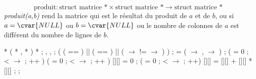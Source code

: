 \begin{solution}
  $$
  \mbox{produit}:  \mbox{struct matrice *} \times \mbox{struct matrice *}  \to \mbox{struct matrice *}
  $$
  \emph{produit(a,b)} rend la matrice qui est le r{\'e}sultat du produit
  de $a$ et de $b$, ou  si $a=\cvar{NULL}$ ou
  $b=\cvar{NULL}$ ou le nombre de colonnes de $a$ est diff{\'e}rent du
  nombre de lignes de $b$.
  \begin{Ccode}
\ctab{}\cstruct {} *
\ctab{} ( \cstruct {} *  , \cstruct {} *  )
\ctab{}\lb
\ctab{}  \cstruct {} *  ;
\ctab{}  \cint {} , ,  ;
\ctab{}
\ctab{}  \cif ( (  ==  ) || (  ==  ) || 
\ctab{}       ( \ensuremath{\rightarrow} !=  \ensuremath{\rightarrow}  ) )
\ctab{}    \creturn {} ;
\ctab{}
\ctab{}   =  ( \ensuremath{\rightarrow} , \ensuremath{\rightarrow} ) ;
\ctab{}  \cfor (  = 0 ;  < \ensuremath{\rightarrow} ; ++ )
\ctab{}    \lb
\ctab{}      \cfor ( = 0 ;  < \ensuremath{\rightarrow} ; ++ )
\ctab{}	\lb
\ctab{}	  [][] = 0 ;
\ctab{}	  \cfor (  = 0 ;  < \ensuremath{\rightarrow} ; ++)
\ctab{}	    \lb
\ctab{}	      [][] = [][] + [][] * [][] ;
\ctab{}	    \rb
\ctab{}	\rb
\ctab{}    \rb
\ctab{}  \creturn {} ;
\ctab{}\rb
  \end{Ccode}
\end{solution}

